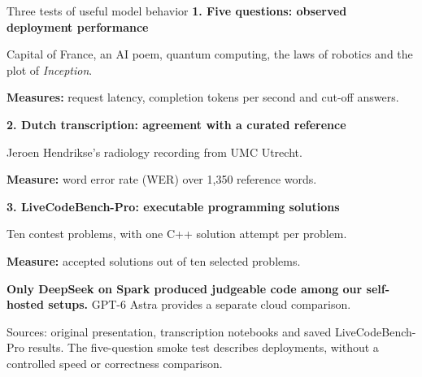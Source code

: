 \documentclass[aspectratio=169,12pt]{beamer}
\newcommand{\source}[1]{\par\vfill{\fontsize{7}{8.5}\selectfont\color{black!65}#1\par}}
\newcommand{\lead}[1]{{\usebeamercolor[fg]{structure}\bfseries #1}}
\begin{document}
\begin{frame}{Three tests of useful model behavior}
\small
\lead{1. Five questions: observed deployment performance}\par
Capital of France, an AI poem, quantum computing, the laws of robotics
and the plot of \emph{Inception}.\par
\textbf{Measures:} request latency, completion tokens per second and cut-off answers.
\par\bigskip

\lead{2. Dutch transcription: agreement with a curated reference}\par
Jeroen Hendrikse's radiology recording from UMC Utrecht.\par
\textbf{Measure:} word error rate (WER) over 1,350 reference words.
\par\bigskip

\lead{3. LiveCodeBench-Pro: executable programming solutions}\par
Ten contest problems, with one C++ solution attempt per problem.\par
\textbf{Measure:} accepted solutions out of ten selected problems.
\par\medskip

\textbf{Only DeepSeek on Spark produced judgeable code among our self-hosted setups.}
GPT-6 Astra provides a separate cloud comparison.
\source{Sources: original presentation, transcription notebooks and saved LiveCodeBench-Pro results.
The five-question smoke test describes deployments, without a controlled speed or correctness comparison.}
\end{frame}
\end{document}
